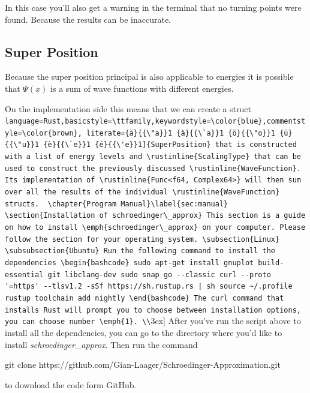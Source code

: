 \documentclass[11pt,DIV=10,final]{scrreprt} %
\providecommand{\rustinline}{\lstinline[language=Rust,basicstyle=\ttfamily,keywordstyle=\color{blue},commentstyle=\color{brown}, literate={ä}{{\"a}}1 {à}{{\`a}}1 {ö}{{\"o}}1 {ü}{{\"u}}1 {è}{{\`e}}1 {é}{{\'e}}1]} % für Inline-C++ Code
\begin{document}
In this case you'll also get a warning in the terminal that no turning points were found.
Because the results can be inaccurate.

\subsection{Super Position}
Because the super position principal is also applicable to energies it is possible that
$\Psi(x)$ is a sum of wave functions with different energies.

On the implementation side this means that we can create a struct \rustinline{SuperPosition}
that is constructed with a list of energy levels and \rustinline{ScalingType} that can
be used to construct the previously discussed \rustinline{WaveFunction}.
Its implementation of \rustinline{Func<f64, Complex64>} will then sum over all the results of
the individual \rustinline{WaveFunction} structs.

\chapter{Program Manual}\label{sec:manual}
\section{Installation of schroedinger\_approx}
This section is a guide on how to install \emph{schroedinger\_approx} on your computer. Please follow the section for your operating system.
\subsection{Linux}
\subsubsection{Ubuntu}
Run the following command to install the dependencies
\begin{bashcode}
sudo apt-get install gnuplot build-essential git libclang-dev
sudo snap go --classic
curl --proto '=https' --tlsv1.2 -sSf https://sh.rustup.rs | sh
source ~/.profile
rustup toolchain add nightly
\end{bashcode}
The curl command that installs Rust will prompt you to choose between installation options, you can choose number \emph{1}.
\\[3ex]
After you've run the script above to install all the dependencies, you can go to the directory where you'd like to install \emph{schroedinger\_approx}. Then run the command
\begin{bashcode}
git clone https://github.com/Gian-Laager/Schroedinger-Approximation.git
\end{bashcode}
to download the code form GitHub.
\end{document}
